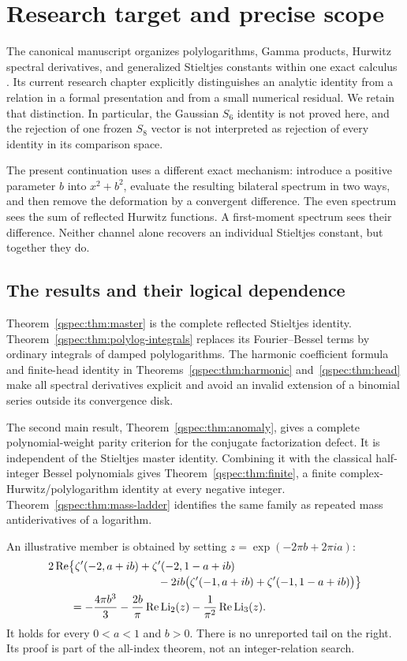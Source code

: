 \documentclass[11pt,letterpaper]{article}
\numberwithin{equation}{section}
\theoremstyle{definition}
\newcommand{\Li}{\operatorname{Li}}
\newcommand{\Rea}{\operatorname{Re}}
\begin{document}
\section{Research target and precise scope}\label{qspec:sec:context}

The canonical manuscript organizes polylogarithms, Gamma products, Hurwitz
spectral derivatives, and generalized Stieltjes constants within one exact
calculus \cite{repo}. Its current research chapter explicitly distinguishes
an analytic identity from a relation in a formal presentation and from a
small numerical residual. We retain that distinction. In particular, the
Gaussian $S_6$ identity is not proved here, and the rejection of one frozen
$S_8$ vector is not interpreted as rejection of every identity in its
comparison space.

The present continuation uses a different exact mechanism: introduce a
positive parameter $b$ into $x^2+b^2$, evaluate the resulting bilateral
spectrum in two ways, and then remove the deformation by a convergent
difference. The even spectrum sees the sum of reflected Hurwitz functions.
A first-moment spectrum sees their difference. Neither channel alone
recovers an individual Stieltjes constant, but together they do.

\subsection{The results and their logical dependence}
Theorem~\ref{qspec:thm:master} is the complete reflected Stieltjes identity.
Theorem~\ref{qspec:thm:polylog-integrals} replaces its Fourier--Bessel terms
by ordinary integrals of damped polylogarithms. The harmonic coefficient
formula and finite-head identity in Theorems~\ref{qspec:thm:harmonic}
and~\ref{qspec:thm:head} make all spectral derivatives explicit and avoid
an invalid extension of a binomial series outside its convergence disk.

The second main result, Theorem~\ref{qspec:thm:anomaly}, gives a complete
polynomial-weight parity criterion for the conjugate factorization defect.
It is independent of the Stieltjes master identity. Combining it with the
classical half-integer Bessel polynomials gives
Theorem~\ref{qspec:thm:finite}, a finite complex-Hurwitz/polylogarithm identity
at every negative integer. Theorem~\ref{qspec:thm:mass-ladder} identifies the
same family as repeated mass antiderivatives of a logarithm.

An illustrative member is obtained by setting
$z=\exp(-2\pi b+2\pi ia)$:
\begin{align}
&2\Rea\bigl\{\zeta'(-2,a+ib)+\zeta'(-2,1-a+ib)\notag\\[-2pt]
&\hspace{35mm}-2ib\bigl(\zeta'(-1,a+ib)+\zeta'(-1,1-a+ib)\bigr)\bigr\}\notag\\
&\qquad=-\frac{4\pi b^3}{3}
-\frac{2b}{\pi}\Rea\Li_2(z)-\frac1{\pi^2}\Rea\Li_3(z).
\label{qspec:eq:opening-example}
\end{align}
It holds for every $0<a<1$ and $b>0$. There is no unreported tail on the
right. Its proof is part of the all-index theorem, not an integer-relation
search.
\end{document}
